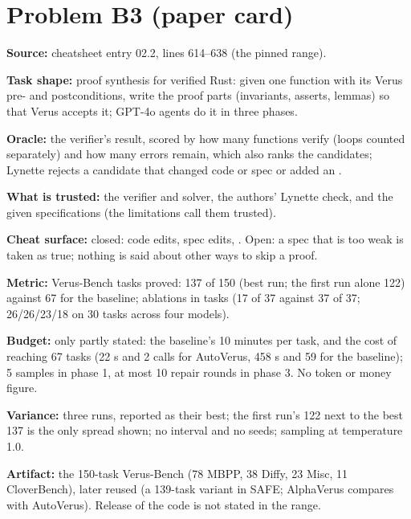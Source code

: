 \documentclass[11pt]{article}
\begin{document}
\section*{Problem B3 (paper card)}\label{ans:B3}
\begin{answer}
\textbf{Source:} cheatsheet entry 02.2, lines 614--638 (the pinned range).

\textbf{Task shape:} proof synthesis for verified Rust: given one function with
its Verus pre- and postconditions, write the proof parts (invariants, asserts,
lemmas) so that Verus accepts it; GPT-4o agents do it in three phases.

\textbf{Oracle:} the verifier's result, scored by how many functions verify
(loops counted separately) and how many errors remain, which also ranks the
candidates; Lynette rejects a candidate that changed code or spec or added an
.

\textbf{What is trusted:} the verifier and solver, the authors' Lynette check,
and the given specifications (the limitations call them trusted).

\textbf{Cheat surface:} closed: code edits, spec edits, . Open: a
spec that is too weak is taken as true; nothing is said about other ways to
skip a proof.

\textbf{Metric:} Verus-Bench tasks proved: 137 of 150 (best run; the first run
alone 122) against 67 for the baseline; ablations in tasks (17 of 37 against 37
of 37; 26/26/23/18 on 30 tasks across four models).

\textbf{Budget:} only partly stated: the baseline's 10 minutes per task, and
the cost of reaching 67 tasks (22 s and 2 calls for AutoVerus, 458 s and 59
for the baseline); 5 samples in phase 1, at most 10 repair rounds in phase 3.
No token or money figure.

\textbf{Variance:} three runs, reported as their best; the first run's 122 next
to the best 137 is the only spread shown; no interval and no seeds; sampling
at temperature 1.0.

\textbf{Artifact:} the 150-task Verus-Bench (78 MBPP, 38 Diffy, 23 Misc, 11
CloverBench), later reused (a 139-task variant in SAFE; AlphaVerus compares
with AutoVerus). Release of the code is not stated in the range.
\end{answer}
\end{document}
